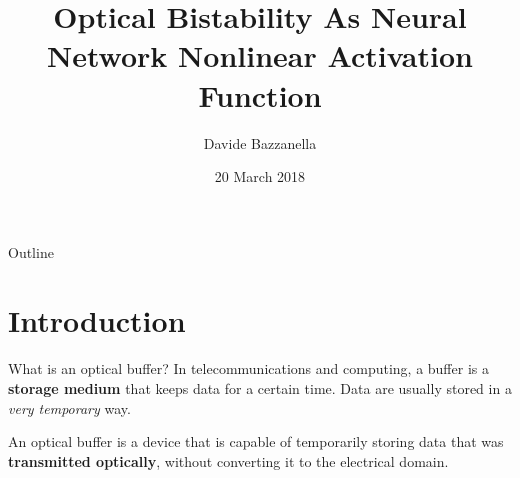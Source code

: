 \documentclass[11pt]{beamer}
\author[D. Bazzanella]{Davide Bazzanella}
\title[All-Optical Neural Networks]{Optical Bistability As Neural Network Nonlinear Activation Function}
\institute[UNITN]{Università degli studi di Trento}
\date{20 March 2018}
\begin{document}
\frame{\titlepage}

\begin{frame}{Outline}
\tableofcontents
\end{frame}

\section{Introduction}
\begin{frame}{What is an optical buffer?}
	In telecommunications and computing, a buffer is a \textbf{storage medium} that keeps data for a certain time.
	Data are usually stored in a \textit{very temporary} way.
	
	\vspace{1em}
	An optical buffer is a device that is capable of temporarily storing data that was \textbf{transmitted optically}, without converting it to the electrical domain.
\end{frame}
\end{document}
